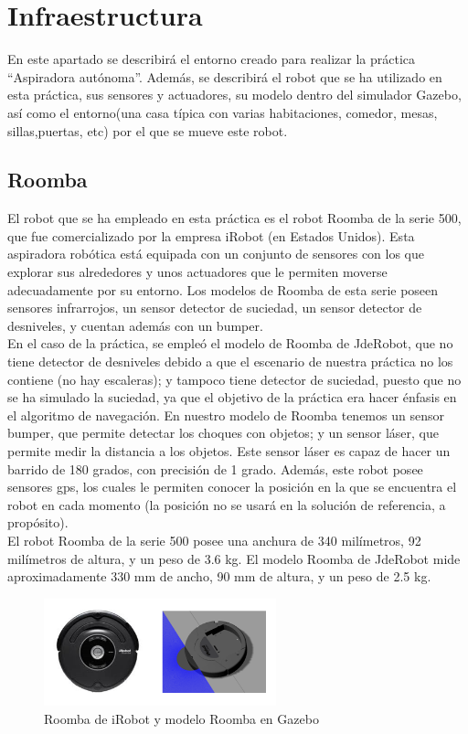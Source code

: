 \section{Infraestructura}
En este apartado se describirá el entorno creado para realizar la práctica ``Aspiradora autónoma''. Además, se describirá el robot que se ha utilizado en esta práctica, sus sensores y actuadores, su modelo dentro del simulador Gazebo, así como el entorno(una casa típica con varias habitaciones, comedor, mesas, sillas,puertas, etc) por el que se mueve este robot. 

\subsection{Roomba}
El robot que se ha empleado en esta práctica es el robot Roomba de la serie 500, que fue comercializado por la empresa iRobot (en Estados Unidos). Esta aspiradora robótica está equipada con un conjunto de sensores con los que explorar sus alrededores y unos actuadores que le permiten moverse adecuadamente por su entorno. Los modelos de Roomba de esta serie poseen sensores infrarrojos, un sensor detector de suciedad, un sensor detector de desniveles, y cuentan además con un bumper.\\

En el caso de la práctica, se empleó el modelo de Roomba de JdeRobot, que no tiene detector de desniveles debido a que el escenario de nuestra práctica no los contiene (no hay escaleras); y tampoco tiene detector de suciedad, puesto que no se ha simulado la suciedad, ya que el objetivo de la práctica era hacer énfasis en el algoritmo de navegación. En nuestro modelo de Roomba tenemos un sensor bumper, que permite detectar los choques con objetos; y un sensor láser, que permite medir la distancia a los objetos. Este sensor láser es capaz de hacer un barrido de 180 grados, con precisión de 1 grado. Además, este robot posee sensores \acrshort{gps}, los cuales le permiten conocer la posición en la que se encuentra el robot en cada momento (la posición no se usará en la solución de referencia, a propósito).\\

El robot Roomba de la serie 500 posee una anchura de 340 milímetros, 92 milímetros de altura, y un peso de 3.6 kg. El modelo Roomba de JdeRobot mide aproximadamente 330 mm de ancho, 90 mm de altura, y un peso de 2.5 kg.\\

\begin{figure}[H]
  \begin{center}
    \includegraphics[width=0.6\textwidth]{figures/Vacuum/Roombas.png}
		\caption{Roomba de iRobot y modelo Roomba en Gazebo}
		\label{fig.roombas}
		\end{center}
\end{figure}

